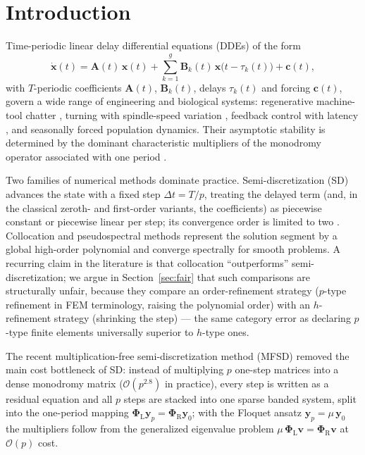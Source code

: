 \documentclass[Afour,sageh,times]{sagej}
\begin{document}
\maketitle

\section{Introduction}
\label{sec:intro}

Time-periodic linear delay differential equations (DDEs) of the form
\begin{equation}
  \dot{\mathbf{x}}(t) = \mathbf{A}(t)\,\mathbf{x}(t)
    + \sum_{k=1}^{g}\mathbf{B}_k(t)\,\mathbf{x}\bigl(t-\tau_k(t)\bigr)
    + \mathbf{c}(t),
  \label{eq:ldde}
\end{equation}
with $T$-periodic coefficients $\mathbf{A}(t)$, $\mathbf{B}_k(t)$, delays
$\tau_k(t)$ and forcing $\mathbf{c}(t)$, govern a wide range of engineering
and biological systems: regenerative machine-tool chatter
\citep{Tobias1965,Altintas2012,Munoa2016}, turning with spindle-speed
variation \citep{Long2007,Seguy2008}, feedback control with latency
\citep{Stepan1989}, and seasonally forced population dynamics. Their
asymptotic stability is determined by the dominant characteristic multipliers of
the monodromy operator associated with one period \citep{Insperger2011}.

Two families of numerical methods dominate practice. Semi-discretization (SD)
\citep{Insperger2002,Insperger2011} advances the state with a fixed step
$\Delta t = T/p$, treating the delayed term (and, in the classical zeroth- and
first-order variants, the coefficients) as piecewise constant or piecewise
linear per step; its convergence order is limited to two
\citep{Insperger2008}. Collocation and pseudospectral methods
\citep{Breda2005,Breda2015} represent the solution segment by a global
high-order polynomial and converge spectrally for smooth problems. A
recurring claim in the literature is that collocation ``outperforms''
semi-discretization; we argue in Section~\ref{sec:fair} that such comparisons
are structurally unfair, because they compare an order-refinement strategy
($p$-type refinement in FEM terminology, raising the polynomial order) with
an $h$-refinement strategy (shrinking the step) --- the same category error as declaring $p$-type finite elements
universally superior to $h$-type ones.

The recent multiplication-free semi-discretization method (MFSD)
\citep{Bachrathy2026} removed the main cost bottleneck of SD: instead of
multiplying $p$ one-step matrices into a dense monodromy matrix
($\mathcal{O}(p^{2.8})$ in practice), every step is written as a residual
equation and all $p$ steps are stacked into one sparse banded system, split
into the one-period mapping
$\mathbf{\Phi}_\mathrm{L}\mathbf{y}_p = \mathbf{\Phi}_\mathrm{R}\mathbf{y}_0$;
with the Floquet ansatz $\mathbf{y}_p = \mu\,\mathbf{y}_0$ the multipliers
follow from the generalized eigenvalue problem
$\mu\,\mathbf{\Phi}_\mathrm{L}\mathbf{v} = \mathbf{\Phi}_\mathrm{R}\mathbf{v}$
at $\mathcal{O}(p)$ cost.
\end{document}
